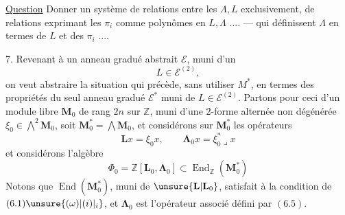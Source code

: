 \uline{Question} Donner un système de  relations entre les $\Lambda,L$ exclusivement,  de relations exprimant les $\pi_i$ comme polynômes en $L,\Lambda$ .... --- qui définissent $\Lambda$ en termes de $L$ et des $\pi_i$ ....

7. Revenant à un anneau gradué abstrait $\mathcal E$, muni d'un
\[
L\in\mathcal E^{(2)},
\]
on veut abstraire la situation qui précède, sans utiliser $M^*$, en termes des propriétés du seul anneau  gradué $\mathcal E^*$ muni de $L\in\mathcal E^{(2)}$.
Partons pour ceci  d'un module libre $\mathbf M_0$ de rang $2n$ sur $\mathbb Z$, muni d'une $2$-forme alternée non dégénérée  $\xi_0\in\bigwedge^2\mathbf M_0$,  soit \deleted{$\xi$} $\mathbf M_0^*=\bigwedge\mathbf M_0$, et considérons sur $\mathbf M_0^*$ les opérateurs
\[
\mathbf Lx=\xi_0x,\qquad\boldsymbol\Lambda_0x=\xi_0^*\mathbin{\lrcorner}x
\]
et considérons l'algèbre
\[
\Phi_0=\mathbb Z[\mathbf L_0,\boldsymbol\Lambda_0]\subset\operatorname{End}_{\mathbb Z}(\mathbf M_0^*)
\]
Notons que $\operatorname{End}(\mathbf M_0^*)$,  muni de $\unsure{\mathbf L|\mathbf L_0}$, satisfait à la condition de $(6.1)\unsure{(\omega)|(i)|_i}$,  et \deleted{$\xi$} $\boldsymbol\Lambda_0$ est l'opérateur associé défini par $(6.5)$.
